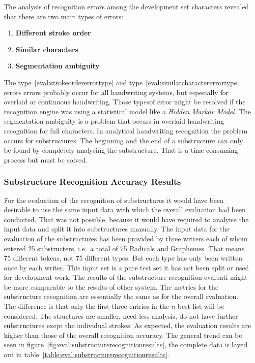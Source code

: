 The analysis of recognition errors among the development set characters 
revealed that there are two main types of errors: 
\begin{enumerate}
\item \textbf{Different stroke order}\label{eval:strokeordererrortype}
\item \textbf{Similar characters}    \label{eval:similarcharactererrortype}
\item \textbf{Segmentation ambiguity}\label{eval:segmentationambiguityerrortype}
\end{enumerate}
The type~\ref{eval:strokeordererrortype} and 
type~\ref{eval:similarcharactererrortype} errors errors probably occur for
all handwriting systems, but especially for overlaid or continuous handwriting.
Those typesof error might be resolved if the recognition engine
was using a statistical model like a \emph{Hidden Markov Model.}
The segmentation ambiguity is a problem that occurs in overlaid handwriting
recognition for full characters. In analytical handwriting recognition
the problem occurs for substructures. The beginning and the end
of a substructure can only be found by completely analysing the substructure.
That is a time consuming process but must be solved.

\subsubsection{Substructure Recognition Accuracy Results}
\label{sec:eval:resultssubstructurerecognition}
For the evaluation of the recognition of substructures it would have been
desirable to use the same input data with which the overall evaluation
had been conducted. That was not possible, because it would have required
to analyise the input data and split it into substructures manually.
The input data for the evaluation of the substructures has been provided by
three writers each of whom entered 25 substructers, i.e.\ a total of 75
Radicals and Graphemes. That means 75 different tokens, not 75 different types.
But each type has only been written once by each writer.
This input set is a pure test set it has not been split or used for
development work. The results of the substructure recognition evaluati
might be more comparable to the results of other system.
The metrics for the substructure recognition are essentially the same as for
the overall evaluation.
The difference is that only the first three entries in the \(n\)-best list
will be considered. The structures are smaller, need less analysis, do not
have further substructures exept the individual strokes. 
As expected, the evaluation results are higher than those of the overall 
recognition accuracy. The general trend can be seen in 
figure~\ref{fig:eval:substructurerecognitionresults}, the complete data is
layed out in table~\ref{table:eval:substructurerecognitionresults}.

